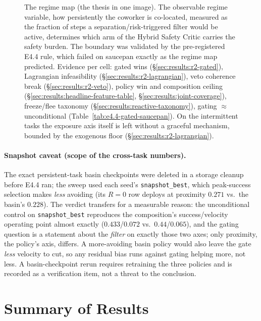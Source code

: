 \documentclass[11pt,a4paper]{report}
\begin{document}
\begin{figure}[htbp]
\caption{The regime map (the thesis in one image). The observable
regime variable, how persistently the coworker is co-located,
measured as the fraction of steps a separation/risk-triggered filter
would be active, determines which arm of the Hybrid Safety Critic
carries the safety burden. The boundary was validated by the
pre-registered E4.4 rule, which failed on saucepan exactly as the
regime map predicted.
Evidence per cell: gated wins
(\S\ref{sec:results:r2-gated}), Lagrangian infeasibility
(\S\ref{sec:results:r2-lagrangian}), veto coherence break
(\S\ref{sec:results:r2-veto}), policy win and composition ceiling
(\S\ref{sec:results:headline-feature-table},
\S\ref{sec:results:joint-coverage}), freeze/flee taxonomy
(\S\ref{sec:results:reactive-taxonomy}), gating $\approx$
unconditional (Table~\ref{tab:e4.4-gated-saucepan}). On the
intermittent tasks the exposure axis itself is left without a
graceful mechanism, bounded by the exogenous floor
(\S\ref{sec:results:r2-lagrangian}).}
\label{fig:regime-map}
\end{figure}

\paragraph{Snapshot caveat (scope of the cross-task numbers).}
The exact persistent-task basin checkpoints were deleted in a
storage cleanup
before E4.4 ran; the sweep used each seed's
\texttt{snapshot\_best}, which peak-success selection makes
\emph{less} avoiding (its $R = 0$ row deploys at proximity $0.271$
vs.\ the basin's $0.228$). The verdict transfers for a measurable
reason: the unconditional control on \texttt{snapshot\_best}
reproduces the composition's success/velocity operating point
almost exactly ($0.433$/$0.072$ vs.\ $0.44$/$0.065$), and the gating
question is a statement about the \emph{filter} on exactly those two
axes; only proximity, the policy's axis, differs. A more-avoiding
basin policy would also leave the gate \emph{less} velocity to cut,
so any residual bias runs against gating helping more, not less. A
basin-checkpoint rerun requires retraining the three policies and is
recorded as a verification item, not a threat to the conclusion.

\section{Summary of Results}
\label{sec:results:summary}
\end{document}
